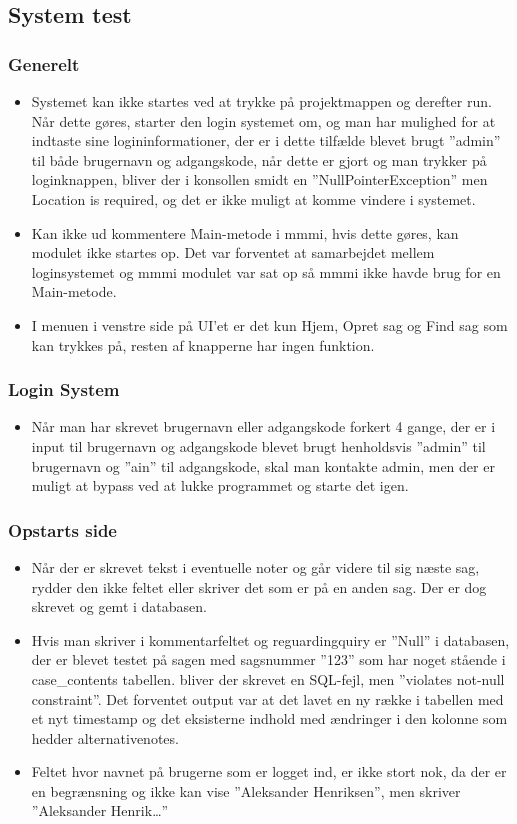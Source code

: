 \subsection{System test}
\subsubsection{Generelt}
\begin{itemize}
\item Systemet kan ikke startes ved at trykke på projektmappen og derefter run. Når dette gøres, starter den login systemet om, og man har mulighed for at indtaste sine logininformationer, der er i dette tilfælde blevet brugt ”admin” til både brugernavn og adgangskode, når dette er gjort og man trykker på loginknappen, bliver der i konsollen smidt en ”NullPointerException” men Location is required, og det er ikke muligt at komme vindere i systemet.
\item Kan ikke ud kommentere Main-metode i mmmi, hvis dette gøres, kan modulet ikke startes op. Det var forventet at samarbejdet mellem loginsystemet og mmmi modulet var sat op så mmmi ikke havde brug for en Main-metode.
\item I menuen i venstre side på UI’et er det kun Hjem, Opret sag og Find sag som kan trykkes på, resten af knapperne har ingen funktion.
\end{itemize}
\subsubsection{Login System}
\begin{itemize}
\item Når man har skrevet brugernavn eller adgangskode forkert 4 gange, der er i input til brugernavn og adgangskode blevet brugt henholdsvis ”admin” til brugernavn og ”ain” til adgangskode, skal man kontakte admin, men der er muligt at bypass ved at lukke programmet og starte det igen.
\end{itemize}
\subsubsection{Opstarts side}
\begin{itemize}
\item Når der er skrevet tekst i eventuelle noter og går videre til sig næste sag, rydder den ikke feltet eller skriver det som er på en anden sag. Der er dog skrevet og gemt i databasen.
\item Hvis man skriver i kommentarfeltet og reguardingquiry er ”Null” i databasen, der er blevet testet på sagen med sagsnummer ”123” som har noget stående i case\_contents tabellen. bliver der skrevet en SQL-fejl, men ”violates not-null constraint”.  Det forventet output var at det lavet en ny række i tabellen med et nyt timestamp og det eksisterne indhold med ændringer i den kolonne som hedder alternativenotes.  
\item Feltet hvor navnet på brugerne som er logget ind, er ikke stort nok, da der er en begrænsning og ikke kan vise ”Aleksander Henriksen”, men skriver ”Aleksander Henrik…”
\end{itemize}
